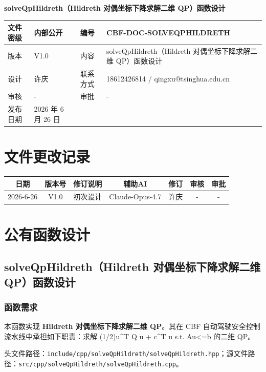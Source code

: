 \documentclass[a4paper,10pt]{article}
\begin{document}
\begin{titlepage}
    \centering
    {\Huge\textbf{solveQpHildreth（Hildreth 对偶坐标下降求解二维 QP）函数设计}\par}
    \vspace{1.5cm}
    \renewcommand{\arraystretch}{1.5}
    \begin{tabular}{|l|l|l|l|}
        \hline
        文件密级 & 内部公开 & 编号 & CBF-DOC-SOLVEQPHILDRETH \\ \hline
        版本 & V1.0 & 内容 & solveQpHildreth（Hildreth 对偶坐标下降求解二维 QP）函数设计 \\ \hline
        设计 & 许庆 & 联系方式 & 18612426814 / qingxu@tsinghua.edu.cn \\ \hline
        审核 & - & 审批 & - \\ \hline
        发布日期 & 2026 年 6 月 26 日 & & \\ \hline
    \end{tabular}
    \vspace{1.5cm}
    \section*{文件更改记录}
    \begin{longtable}{|c|c|p{4cm}|c|c|c|c|}
        \hline
        日期 & 版本号 & 修订说明 & 辅助AI & 修订 & 审核 & 审批 \\ \hline
        2026-6-26 & V1.0 & 初次设计 & Claude-Opus-4.7 & 许庆 & - & - \\ \hline
    \end{longtable}
\end{titlepage}
\tableofcontents
\newpage
\section{公有函数设计}
\subsection{solveQpHildreth（Hildreth 对偶坐标下降求解二维 QP）函数设计}
\subsubsection{函数需求}
\par 本函数实现 \textbf{Hildreth 对偶坐标下降求解二维 QP}。其在 CBF 自动驾驶安全控制流水线中承担如下职责：求解 (1/2)u\textasciicircum{}T Q u + c\textasciicircum{}T u s.t. Au<=b 的二维 QP。
\par 头文件路径：\texttt{include/cpp/solveQpHildreth/solveQpHildreth.hpp}；源文件路径：\texttt{src/cpp/solveQpHildreth/solveQpHildreth.cpp}。
\end{document}
